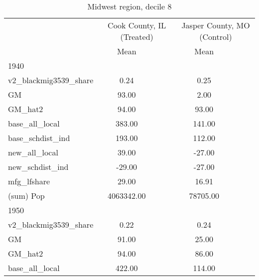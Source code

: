 \begin{table}[htbp]\centering
\def\sym#1{\ifmmode^{#1}\else\(^{#1}\)\fi}
\caption{Midwest region, decile 8 \label{tab1}}
\begin{tabular}{l*{2}{ccc}}
\toprule
                    &\multicolumn{3}{c}{Cook County, IL (Treated)}&\multicolumn{3}{c}{Jasper County, MO (Control)}\\
                    &        Mean&            &            &        Mean&            &            \\
\midrule
1940                &            &            &            &            &            &            \\
v2\_blackmig3539\_share&        0.24&            &            &        0.25&            &            \\
GM                  &       93.00&            &            &        2.00&            &            \\
GM\_hat2             &       94.00&            &            &       93.00&            &            \\
base\_all\_local      &      383.00&            &            &      141.00&            &            \\
base\_schdist\_ind    &      193.00&            &            &      112.00&            &            \\
new\_all\_local       &       39.00&            &            &      -27.00&            &            \\
new\_schdist\_ind     &      -29.00&            &            &      -27.00&            &            \\
mfg\_lfshare         &       29.00&            &            &       16.91&            &            \\
(sum) Pop           &  4063342.00&            &            &    78705.00&            &            \\
\midrule
1950                &            &            &            &            &            &            \\
v2\_blackmig3539\_share&        0.22&            &            &        0.24&            &            \\
GM                  &       91.00&            &            &       25.00&            &            \\
GM\_hat2             &       94.00&            &            &       86.00&            &            \\
base\_all\_local      &      422.00&            &            &      114.00&            &            \\

\end{tabular}
\end{table}
